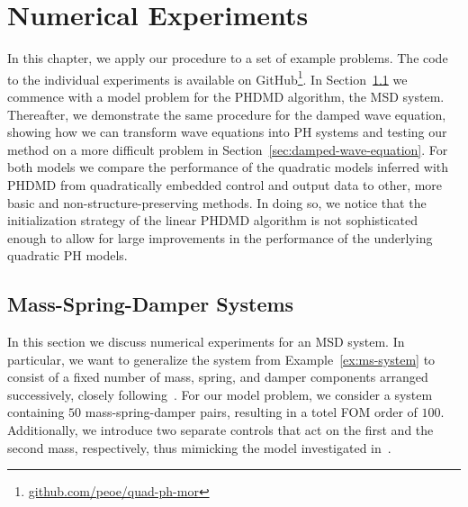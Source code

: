 \chapter{Numerical Experiments}\label{chap:numerical-experiments}

In this chapter, we apply our procedure to a set of example problems.
The code to the individual experiments is available on GitHub\footnote{\href{https://www.github.com/peoe/quad-ph-mor}{github.com/peoe/quad-ph-mor}}.
In Section~\ref{sec:msd-systems} we commence with a model problem for the \ac{PHDMD} algorithm, the \ac{MSD} system.
Thereafter, we demonstrate the same procedure for the damped wave equation, showing how we can transform wave equations into \ac{PH} systems and testing our method on a more difficult problem in Section~\ref{sec:damped-wave-equation}.
For both models we compare the performance of the quadratic models inferred with \ac{PHDMD} from quadratically embedded control and output data to other, more basic and non-structure-preserving methods.
In doing so, we notice that the initialization strategy of the linear \ac{PHDMD} algorithm is not sophisticated enough to allow for large improvements in the performance of the underlying quadratic \ac{PH} models.

\section{Mass-Spring-Damper Systems}\label{sec:msd-systems}

In this section we discuss numerical experiments for an \ac{MSD} system.
In particular, we want to generalize the system from Example~\ref{ex:ms-system} to consist of a fixed number of mass, spring, and damper components arranged successively, closely following~\cite{Gugercin2012, Morandin2023}.
For our model problem, we consider a system containing $50$ mass-spring-damper pairs, resulting in a totel \ac{FOM} order of $100$.
Additionally, we introduce two separate controls that act on the first and the second mass, respectively, thus mimicking the model investigated in~\cite[Section~4.3]{Morandin2023}.

